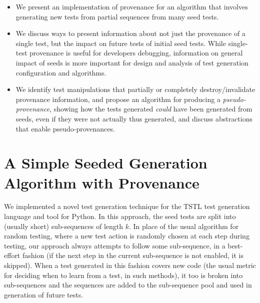 \documentclass[final]{article}
\begin{document}
\begin{itemize}
\item We present an implementation of provenance for an algorithm that involves
  generating new tests from partial sequences from many seed tests.
\item We discuss ways to present information about not just the
  provenance of a single test, but the impact on future tests of
  initial seed tests.  While single-test provenance is useful for
  developers debugging, information on general impact of seeds is more
  important for design and analysis of test generation configuration
  and algorithms.
\item We identify test manipulations that partially or completely
  destroy/invalidate provenance information, and propose an algorithm
  for producing a \emph{pseudo-provenance}, showing how the tests generated
  \emph{could} have been generated from seeds, even if they were not actually
  thus generated, and discuss abstractions that enable pseudo-provenances.
\end{itemize}

\section{A Simple Seeded Generation Algorithm with Provenance}

We implemented a novel test generation technique for the TSTL
\cite{tstlsttt,nfm15,issta15,tstl} test generation language and tool for
Python.  In this approach, the seed tests are split into (usually short)
sub-sequences of length $k$.  In place of the usual algorithm for
random testing, where a new test action is randomly chosen at each
step during testing, our approach always attempts to follow some
sub-sequence, in a best-effort fashion (if the next step in the
current sub-sequence is not enabled, it is skipped).  When a test
generated in this fashion covers new code (the usual metric for
deciding when to learn from a test, in such methods), it too is broken into sub-sequences
and the sequences are added to the sub-sequence pool and used in generation of
future tests.
\end{document}

